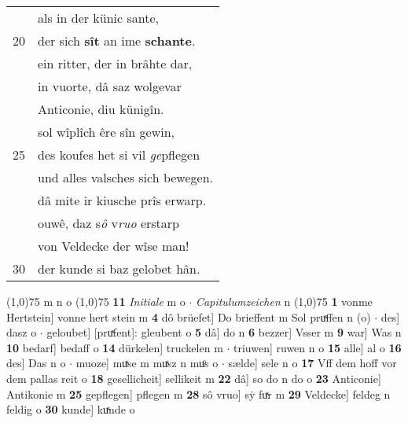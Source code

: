 \documentclass[8pt,a4paper,notitlepage]{article}
\begin{document}
\begin{table}[ht]
\begin{minipage}[t]{0.5\linewidth}
\begin{tabular}{rl}
 & als in der künic sante,\\ 
20 & der sich \textbf{sît} an ime \textbf{schante}.\\ 
 & ein ritter, der in brâhte dar,\\ 
 & in vuorte, dâ saz wolgevar\\ 
 & Anticonie, diu künigîn.\\ 
 & sol wîplîch êre sîn gewin,\\ 
25 & des koufes het si vil \textit{ge}pflegen\\ 
 & und alles valsches sich bewegen.\\ 
 & dâ mite ir kiusche prîs erwarp.\\ 
 & ouwê, daz s\textit{ô} v\textit{ruo} erstarp\\ 
 & von Veldecke der wîse man!\\ 
30 & der kunde si baz gelobet hân.\\ 
\end{tabular}
\scriptsize
\line(1,0){75} \newline
m n o \newline
\line(1,0){75} \newline
\textbf{11} \textit{Initiale} m o   $\cdot$ \textit{Capitulumzeichen} n  \newline
\line(1,0){75} \newline
\textbf{1} vonme Hertstein] vonne hert stein m \textbf{4} dô brüefet] Do brieffent m Sol pruͯffen n (o)  $\cdot$ des] dasz o  $\cdot$ geloubet] [pruͯfent]: gleubent o \textbf{5} dâ] do n \textbf{6} bezzer] Vsser m \textbf{9} war] Was n \textbf{10} bedarf] bedaff o \textbf{14} dürkelen] truckelen m  $\cdot$ triuwen] ruwen n o \textbf{15} alle] al o \textbf{16} des] Das n o  $\cdot$ muoze] muͯse m muͯsz n muͦs o  $\cdot$ sælde] sele n o \textbf{17} Vff dem hoff vor dem pallas reit o \textbf{18} gesellicheit] sellikeit m \textbf{22} dâ] so do n do o \textbf{23} Anticonie] Antikonie m \textbf{25} gepflegen] pflegen m \textbf{28} sô vruo] sẏ fuͯr m \textbf{29} Veldecke] feldeg n feldig o \textbf{30} kunde] kuͯnde o \newline
\end{minipage}
\end{table}
\newpage
\end{document}
